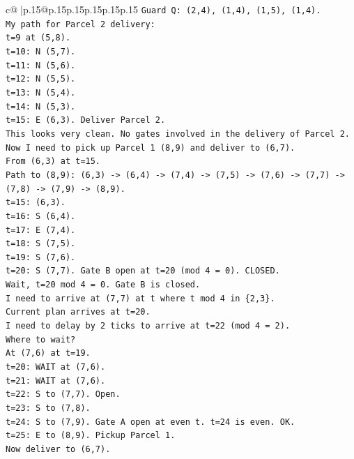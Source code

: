 \documentclass{article}
\begin{document}
{\begin{supertabular}{c@{$\;$}|p{.15\linewidth}@{}p{.15\linewidth}p{.15\linewidth}p{.15\linewidth}p{.15\linewidth}p{.15\linewidth}}
{{{\texttt{Guard Q: (2,4), (1,4), (1,5), (1,4).} \\
\texttt{My path for Parcel 2 delivery:} \\
\texttt{t=9 at (5,8).} \\
\texttt{t=10: N (5,7).} \\
\texttt{t=11: N (5,6).} \\
\texttt{t=12: N (5,5).} \\
\texttt{t=13: N (5,4).} \\
\texttt{t=14: N (5,3).} \\
\texttt{t=15: E (6,3). Deliver Parcel 2.} \\
\texttt{This looks very clean. No gates involved in the delivery of Parcel 2.} \\
\texttt{Now I need to pick up Parcel 1 (8,9) and deliver to (6,7).} \\
\texttt{From (6,3) at t=15.} \\
\texttt{Path to (8,9): (6,3) {-}> (6,4) {-}> (7,4) {-}> (7,5) {-}> (7,6) {-}> (7,7) {-}> (7,8) {-}> (7,9) {-}> (8,9).} \\
\texttt{t=15: (6,3).} \\
\texttt{t=16: S (6,4).} \\
\texttt{t=17: E (7,4).} \\
\texttt{t=18: S (7,5).} \\
\texttt{t=19: S (7,6).} \\
\texttt{t=20: S (7,7). Gate B open at t=20 (mod 4 = 0). CLOSED.} \\
\texttt{Wait, t=20 mod 4 = 0. Gate B is closed.} \\
\texttt{I need to arrive at (7,7) at t where t mod 4 in \{2,3\}.} \\
\texttt{Current plan arrives at t=20.} \\
\texttt{I need to delay by 2 ticks to arrive at t=22 (mod 4 = 2).} \\
\texttt{Where to wait?} \\
\texttt{At (7,6) at t=19.} \\
\texttt{t=20: WAIT at (7,6).} \\
\texttt{t=21: WAIT at (7,6).} \\
\texttt{t=22: S to (7,7). Open.} \\
\texttt{t=23: S to (7,8).} \\
\texttt{t=24: S to (7,9). Gate A open at even t. t=24 is even. OK.} \\
\texttt{t=25: E to (8,9). Pickup Parcel 1.} \\
\texttt{Now deliver to (6,7).} \\
}}}
\end{supertabular}}
\end{document}
